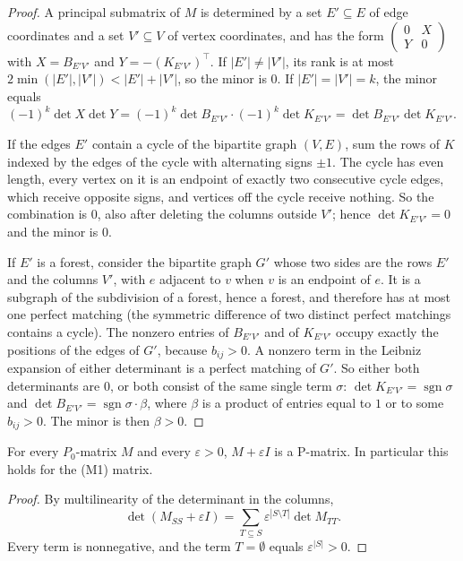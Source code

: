 \begin{proof}
A principal submatrix of $M$ is determined by a set $E'\subseteq E$ of edge coordinates and a set
$V'\subseteq V$ of vertex coordinates, and has the form
$\left(\begin{smallmatrix}0&X\\Y&0\end{smallmatrix}\right)$ with $X=B_{E'V'}$ and $Y=-(K_{E'V'})^{\top}$.
If $|E'|\ne|V'|$, its rank is at most $2\min(|E'|,|V'|)<|E'|+|V'|$, so the minor is $0$. If
$|E'|=|V'|=k$, the minor equals $(-1)^{k}\det X\det Y=(-1)^k\det B_{E'V'}\cdot(-1)^k\det K_{E'V'}
=\det B_{E'V'}\det K_{E'V'}$.

If the edges $E'$ contain a cycle of the bipartite graph $(V,E)$, sum the rows of $K$ indexed by the
edges of the cycle with alternating signs $\pm1$. The cycle has even length, every vertex on it is an
endpoint of exactly two consecutive cycle edges, which receive opposite signs, and vertices off the cycle
receive nothing. So the combination is $0$, also after deleting the columns outside $V'$; hence
$\det K_{E'V'}=0$ and the minor is $0$.

If $E'$ is a forest, consider the bipartite graph $G'$ whose two sides are the rows $E'$ and the
columns $V'$, with $e$ adjacent to $v$ when $v$ is an endpoint of $e$. It is a subgraph of the
subdivision of a forest, hence a forest, and therefore has at most one perfect matching (the symmetric
difference of two distinct perfect matchings contains a cycle). The nonzero entries of $B_{E'V'}$ and of
$K_{E'V'}$ occupy exactly the positions of the edges of $G'$, because $b_{ij}>0$. A nonzero term in the
Leibniz expansion of either determinant is a perfect matching of $G'$. So either both determinants are
$0$, or both consist of the same single term $\sigma$: $\det K_{E'V'}=\operatorname{sgn}\sigma$ and
$\det B_{E'V'}=\operatorname{sgn}\sigma\cdot\beta$, where $\beta$ is a product of entries equal to $1$
or to some $b_{ij}>0$. The minor is then $\beta>0$.
\end{proof}

\begin{lemma}\label{plcp:lem:pmatrix}
For every $P_0$-matrix $M$ and every $\varepsilon>0$, $M+\varepsilon I$ is a P-matrix. In particular
this holds for the (M1) matrix.
\end{lemma}

\begin{proof}
By multilinearity of the determinant in the columns,
\[\det(M_{SS}+\varepsilon I)=\sum_{T\subseteq S}\varepsilon^{|S\setminus T|}\det M_{TT}.\] Every term is
nonnegative, and the term $T=\emptyset$ equals $\varepsilon^{|S|}>0$.
\end{proof}

